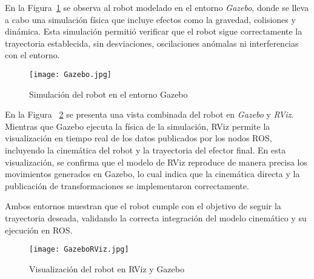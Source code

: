 En la Figura~\ref{fig:simulacion_gazebo} se observa al robot modelado en el entorno \textit{Gazebo}, donde se lleva a cabo una simulación física que incluye efectos como la gravedad, colisiones y dinámica. Esta simulación permitió verificar que el robot sigue correctamente la trayectoria establecida, sin desviaciones, oscilaciones anómalas ni interferencias con el entorno.

\begin{figure}[H]
	\centering
	\texttt{[image: Gazebo.jpg]}
	\caption{Simulación del robot en el entorno Gazebo}
	\label{fig:simulacion_gazebo}
\end{figure}

En la Figura ~\ref{fig:GazeboYrviz} se presenta una vista combinada del robot en \textit{Gazebo} y \textit{RViz}. Mientras que Gazebo ejecuta la física de la simulación, RViz permite la visualización en tiempo real de los datos publicados por los nodos ROS, incluyendo la cinemática del robot y la trayectoria del efector final. En esta visualización, se confirma que el modelo de RViz reproduce de manera precisa los movimientos generados en Gazebo, lo cual indica que la cinemática directa y la publicación de transformaciones se implementaron correctamente.

Ambos entornos muestran que el robot cumple con el objetivo de seguir la trayectoria deseada, validando la correcta integración del modelo cinemático y su ejecución en ROS.


\begin{figure}[H]
	\centering
	\texttt{[image: GazeboRViz.jpg]}
	\caption{Visualización del robot en RViz y Gazebo}
	\label{fig:GazeboYrviz}
\end{figure}
